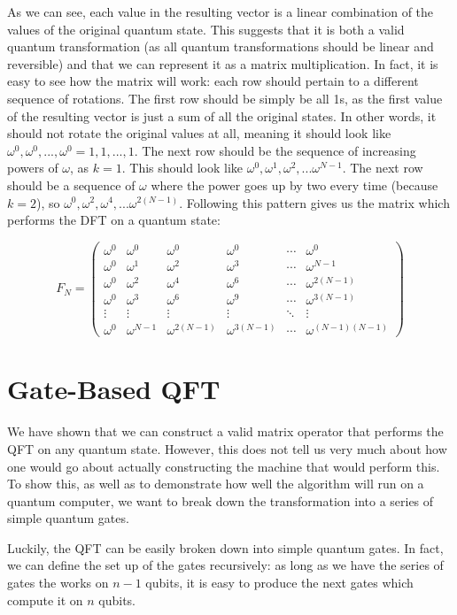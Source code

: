 \documentclass[11pt]{report}
\newcommand{\?}{\stackrel{?}{=}}
\begin{document}
As we can see, each value in the resulting vector is a linear combination of the values of the original quantum state. This suggests that it is both a valid quantum transformation (as all quantum transformations should be linear and reversible) and that we can represent it as a matrix multiplication. In fact, it is easy to see how the matrix will work: each row should pertain to a different sequence of rotations. The first row should be simply be all 1s, as the first value of the resulting vector is just a sum of all the original states. In other words, it should not rotate the original values at all, meaning it should look like $\omega^0, \omega^0, ... ,\omega^0 = 1, 1, ..., 1$. The next row should be the sequence of increasing powers of $\omega$, as $k = 1$. This should look like $\omega^0, \omega^1, \omega^2, ... \omega^{N-1}$. The next row should be a sequence of $\omega$ where the power goes up by two every time (because $k = 2$), so $\omega^0, \omega^2, \omega^4, ... \omega^{2(N-1)}$. Following this pattern gives us the matrix which performs the DFT on a quantum state:

$$F_N = \begin{pmatrix}
  \omega^0 & \omega^0 & \omega^0 & \omega^0 & \cdots & \omega^0 \\
  \omega^0 & \omega^1 & \omega^2 & \omega^3 & \cdots & \omega^{N-1} \\
  \omega^0 & \omega^2 & \omega^4 & \omega^6 & \cdots & \omega^{2(N-1)} \\
  \omega^0 & \omega^3 & \omega^6 & \omega^9 & \cdots & \omega^{3(N-1)} \\
  \vdots & \vdots & \vdots & \vdots & \ddots & \vdots \\
  \omega^0 & \omega^{N-1} & \omega^{2(N-1)} & \omega^{3(N-1)} & \cdots & \omega^{(N-1)(N-1)}
  \end{pmatrix}$$

\section{Gate-Based QFT}
We have shown that we can construct a valid matrix operator that performs the QFT on any quantum state. However, this does not tell us very much about how one would go about actually constructing the machine that would perform this. To show this, as well as to demonstrate how well the algorithm will run on a quantum computer, we want to break down the transformation into a series of simple quantum gates.

Luckily, the QFT can be easily broken down into simple quantum gates. In fact, we can define the set up of the gates recursively: as long as we have the series of gates the works on $n-1$ qubits, it is easy to produce the next gates which compute it on $n$ qubits.
\end{document}
